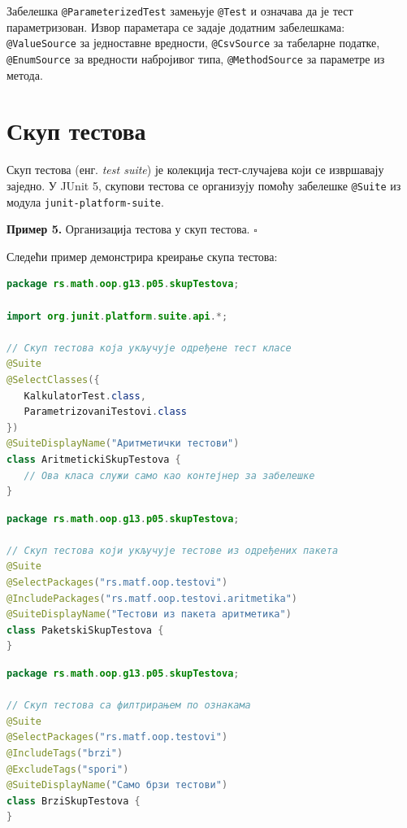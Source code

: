 Забелешка \texttt{@ParameterizedTest} замењује \texttt{@Test} и означава да је тест параметризован. Извор параметара се задаје додатним забелешкама: \texttt{@ValueSource} за једноставне вредности, \texttt{@CsvSource} за табеларне податке, \texttt{@EnumSource} за вредности набројивог типа, \texttt{@MethodSource} за параметре из метода.


\section{Скуп тестова}

Скуп тестова (енг. \textit{test suite}) је колекција тест-случајева који се извршавају заједно. У JUnit 5, скупови тестова се организују помоћу забелешке \texttt{@Suite} из модула \texttt{junit-platform-suite}.


\bigskip

\noindent \textbf{Пример 5.} Организација тестова у скуп тестова. $\square$

\medskip

Следећи пример демонстрира креирање скупа тестова:


\begin{lstlisting}[language=Java]
package rs.math.oop.g13.p05.skupTestova;
 
import org.junit.platform.suite.api.*;
 
// Скуп тестова која укључује одређене тест класе
@Suite
@SelectClasses({
   KalkulatorTest.class,
   ParametrizovaniTestovi.class
})
@SuiteDisplayName("Аритметички тестови")
class AritmetickiSkupTestova {
   // Ова класа служи само као контејнер за забелешке
}
\end{lstlisting}


\begin{lstlisting}[language=Java]
package rs.math.oop.g13.p05.skupTestova;
 
// Скуп тестова који укључује тестове из одређених пакета
@Suite
@SelectPackages("rs.matf.oop.testovi")
@IncludePackages("rs.matf.oop.testovi.aritmetika")
@SuiteDisplayName("Тестови из пакета аритметика")
class PaketskiSkupTestova {
}
\end{lstlisting}


\begin{lstlisting}[language=Java]
package rs.math.oop.g13.p05.skupTestova;
 
// Скуп тестова са филтрирањем по ознакама
@Suite
@SelectPackages("rs.matf.oop.testovi")
@IncludeTags("brzi")
@ExcludeTags("spori")
@SuiteDisplayName("Само брзи тестови")
class BrziSkupTestova {
}
\end{lstlisting}


